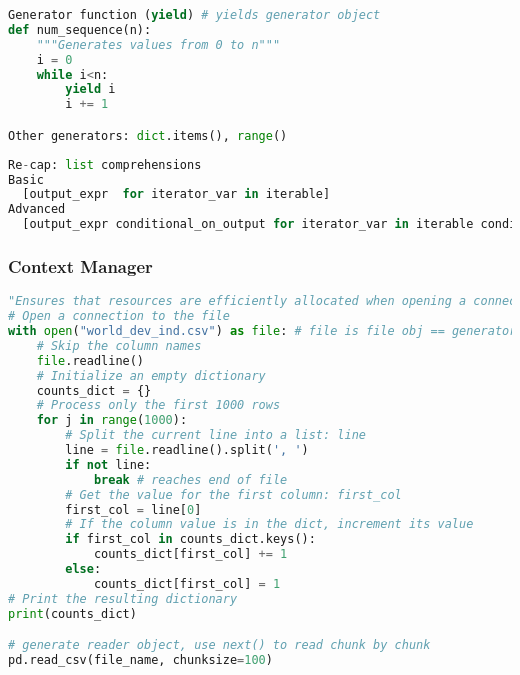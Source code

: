 \documentclass[12pt]{article}
\begin{document}
\begin{lstlisting}[language=Python]
Generator function (yield) # yields generator object
def num_sequence(n):
    """Generates values from 0 to n"""
    i = 0
    while i<n:
        yield i
        i += 1

Other generators: dict.items(), range()
\end{lstlisting}

\begin{lstlisting}[language=Python]
Re-cap: list comprehensions
Basic
  [output_expr  for iterator_var in iterable]
Advanced
  [output_expr conditional_on_output for iterator_var in iterable conditional_on_iterable]
\end{lstlisting}

\subsubsection{\normalsize Context Manager}
\begin{lstlisting}[language=Python]
"Ensures that resources are efficiently allocated when opening a connection to a file"
# Open a connection to the file
with open("world_dev_ind.csv") as file: # file is file obj == generator
    # Skip the column names
    file.readline()
    # Initialize an empty dictionary
    counts_dict = {}
    # Process only the first 1000 rows
    for j in range(1000):
        # Split the current line into a list: line
        line = file.readline().split(', ')
        if not line:
            break # reaches end of file
        # Get the value for the first column: first_col
        first_col = line[0]
        # If the column value is in the dict, increment its value
        if first_col in counts_dict.keys():
            counts_dict[first_col] += 1
        else:
            counts_dict[first_col] = 1
# Print the resulting dictionary
print(counts_dict)

# generate reader object, use next() to read chunk by chunk
pd.read_csv(file_name, chunksize=100) 
\end{lstlisting}
\end{document}
